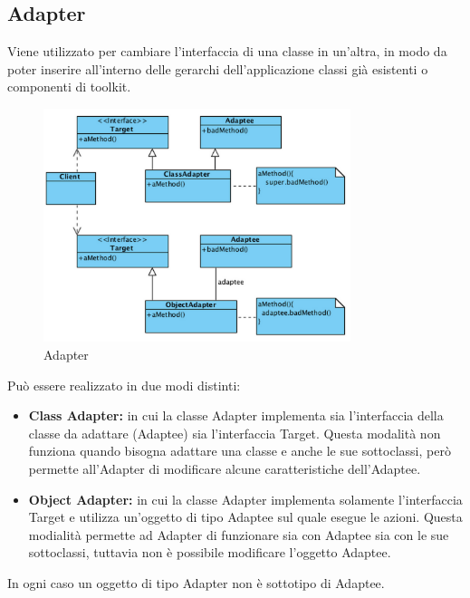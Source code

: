 \subsection{Adapter}
Viene utilizzato per cambiare l’interfaccia di una classe in un’altra, in modo da poter inserire all’interno delle gerarchi dell’applicazione classi già esistenti o componenti di toolkit.

\begin{figure}[ht]
    \centering
    \includegraphics[width=0.8\textwidth]{immagini/adapter.png}
    \caption{Adapter}
\end{figure}
\FloatBarrier

Può essere realizzato in due modi distinti:
\begin{itemize}
\item \textbf{Class Adapter:} in cui la classe Adapter implementa sia l’interfaccia della classe da adattare (Adaptee) sia l’interfaccia Target. Questa modalità non funziona quando bisogna adattare una classe e anche le sue sottoclassi, però permette all’Adapter di modificare alcune caratteristiche dell’Adaptee.
\item \textbf{Object Adapter:} in cui la classe Adapter implementa solamente l’interfaccia Target e utilizza un’oggetto di tipo Adaptee sul quale esegue le azioni. Questa modialità permette ad Adapter di funzionare sia con Adaptee sia con le sue sottoclassi, tuttavia non è possibile modificare l’oggetto Adaptee.
\end{itemize}
In ogni caso un oggetto di tipo Adapter non è sottotipo di Adaptee.